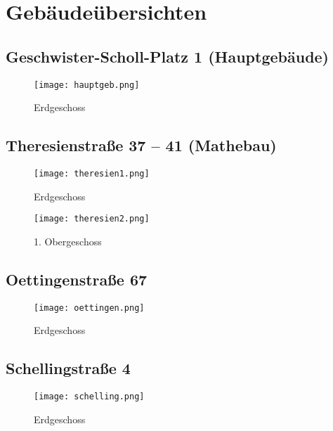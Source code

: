 ﻿
\chapter{Gebäudeübersichten}


\section*{Geschwister-Scholl-Platz 1 (Hauptgebäude)}
\begin{figure}[H]
	\centering
	\texttt{[image: hauptgeb.png]}
	\caption{Erdgeschoss}
\end{figure}

\section*{Theresienstraße 37 -- 41 (Mathebau)}
\begin{figure}[H]
	\centering%
	\begin{minipage}{.5\textwidth}
		\centering
		\texttt{[image: theresien1.png]}
		\caption{Erdgeschoss}
	\end{minipage}%
	\begin{minipage}{.5\textwidth}
		\centering
		\texttt{[image: theresien2.png]}
		\caption{1. Obergeschoss}
	\end{minipage}
\end{figure}

\section*{Oettingenstraße 67\subjectList{\subjectMI{}\subjectI{}}}
\begin{figure}[H]
	\centering
	\texttt{[image: oettingen.png]}
	\caption{Erdgeschoss}
\end{figure}

\section*{Schellingstraße 4\subjectList{\subjectP{}}}
\begin{figure}[H]
	\centering
	\texttt{[image: schelling.png]}
	\caption{Erdgeschoss}
\end{figure}
